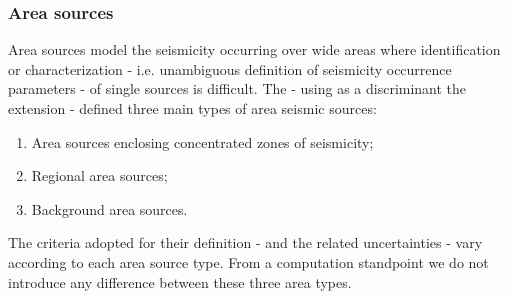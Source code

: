 \subsubsection{Area sources}
\label{hazard:seismic_source_types:areaSources}
%
Area sources model the seismicity occurring over wide areas where  
identification or characterization - i.e. unambiguous definition 
of seismicity occurrence parameters - of single sources is difficult. 
%
The \citet{sshac1997} - using as a discriminant the extension - 
defined three main types of area seismic sources:
\begin{enumerate}
\item Area sources enclosing concentrated zones of seismicity;
\item Regional area sources;
\item Background area sources.
\end{enumerate}
%
The criteria adopted for their definition - and the related 
uncertainties - vary according to each area source type. 
%
From a computation standpoint we do not introduce any difference 
between these three area types.
%

